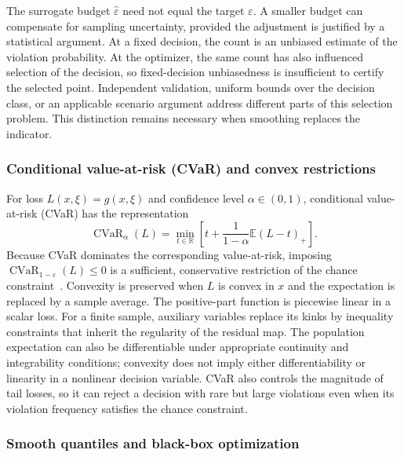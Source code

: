 The surrogate budget $\hat\varepsilon$ need not equal the target $\varepsilon$. A smaller budget can compensate for sampling uncertainty, provided the adjustment is justified by a statistical argument. At a fixed decision, the count is an unbiased estimate of the violation probability. At the optimizer, the same count has also influenced selection of the decision, so fixed-decision unbiasedness is insufficient to certify the selected point. Independent validation, uniform bounds over the decision class, or an applicable scenario argument address different parts of this selection problem. This distinction remains necessary when smoothing replaces the indicator.

\subsubsection{Conditional value-at-risk (CVaR) and convex restrictions}
\label{ssec:cvar}

For loss $L(x,\xi)=g(x,\xi)$ and confidence level $\alpha\in(0,1)$, conditional value-at-risk (CVaR) has the representation
\begin{equation}
 \operatorname{CVaR}_{\alpha}(L)=\min_{t\in\mathbb R}\left[t+\frac{1}{1-\alpha}\mathbb E(L-t)_+\right].
 \label{eq:ch2-cvar}
\end{equation}
Because CVaR dominates the corresponding value-at-risk, imposing $\operatorname{CVaR}_{1-\varepsilon}(L)\leq0$ is a sufficient, conservative restriction of the chance constraint~\citep{rockafellar2000,nemirovski2006}. Convexity is preserved when $L$ is convex in $x$ and the expectation is replaced by a sample average. The positive-part function is piecewise linear in a scalar loss. For a finite sample, auxiliary variables replace its kinks by inequality constraints that inherit the regularity of the residual map. The population expectation can also be differentiable under appropriate continuity and integrability conditions; convexity does not imply either differentiability or linearity in a nonlinear decision variable. CVaR also controls the magnitude of tail losses, so it can reject a decision with rare but large violations even when its violation frequency satisfies the chance constraint.

\subsubsection{Smooth quantiles and black-box optimization}
\label{ssec:quantile}

